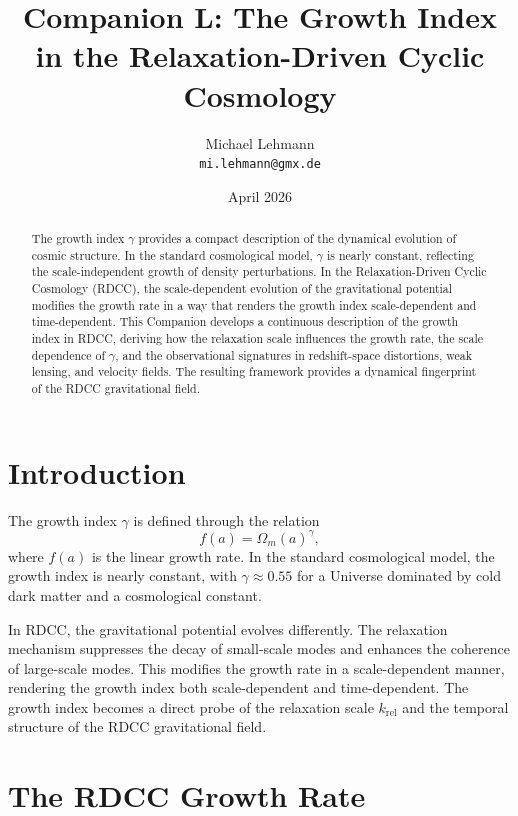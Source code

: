 \documentclass[11pt,a4paper]{article}
\title{\textbf{Companion L: The Growth Index in the Relaxation-Driven Cyclic Cosmology}}
\author{Michael Lehmann \\ \texttt{mi.lehmann@gmx.de}}
\date{April 2026}
\begin{document}
\maketitle

\begin{abstract}
The growth index $\gamma$ provides a compact description of the dynamical evolution 
of cosmic structure. In the standard cosmological model, $\gamma$ is nearly 
constant, reflecting the scale-independent growth of density perturbations. In the 
Relaxation-Driven Cyclic Cosmology (RDCC), the scale-dependent evolution of the 
gravitational potential modifies the growth rate in a way that renders the growth 
index scale-dependent and time-dependent. This Companion develops a continuous 
description of the growth index in RDCC, deriving how the relaxation scale 
influences the growth rate, the scale dependence of $\gamma$, and the observational 
signatures in redshift-space distortions, weak lensing, and velocity fields. The 
resulting framework provides a dynamical fingerprint of the RDCC gravitational 
field.
\end{abstract}
\section{Introduction}

The growth index $\gamma$ is defined through the relation
\begin{equation}
    f(a) = \Omega_{m}(a)^{\gamma},
\end{equation}
where $f(a)$ is the linear growth rate. In the standard cosmological model, the 
growth index is nearly constant, with $\gamma \approx 0.55$ for a Universe 
dominated by cold dark matter and a cosmological constant.

In RDCC, the gravitational potential evolves differently. The relaxation mechanism 
suppresses the decay of small-scale modes and enhances the coherence of large-scale 
modes. This modifies the growth rate in a scale-dependent manner, rendering the 
growth index both scale-dependent and time-dependent. The growth index becomes a 
direct probe of the relaxation scale $k_{\mathrm{rel}}$ and the temporal structure 
of the RDCC gravitational field.
\section{The RDCC Growth Rate}
\end{document}
